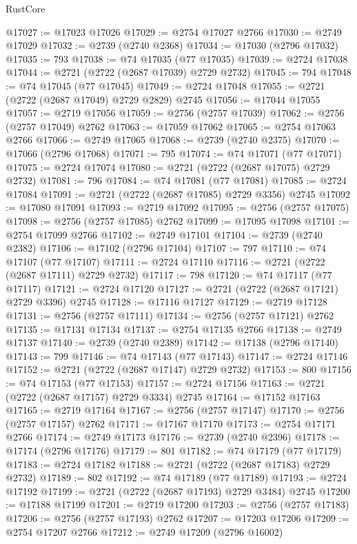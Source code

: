 \begin{lexlean}{RustCore}
\begin{coremodule}
@17027 := @17023 @17026
@17029 := @2754 @17027 @2766
@17030 := @2749 @17029
@17032 := @2739 (@2740 @2368)
@17034 := @17030 (@2796 @17032)
@17035 := 793
@17038 := @74 @17035 (@77 @17035)
@17039 := @2724 @17038
@17044 := @2721 (@2722 (@2687 @17039) @2729 @2732)
@17045 := 794
@17048 := @74 @17045 (@77 @17045)
@17049 := @2724 @17048
@17055 := @2721 (@2722 (@2687 @17049) @2729 @2829) @2745
@17056 := @17044 @17055
@17057 := @2719 @17056
@17059 := @2756 (@2757 @17039)
@17062 := @2756 (@2757 @17049) @2762
@17063 := @17059 @17062
@17065 := @2754 @17063 @2766
@17066 := @2749 @17065
@17068 := @2739 (@2740 @2375)
@17070 := @17066 (@2796 @17068)
@17071 := 795
@17074 := @74 @17071 (@77 @17071)
@17075 := @2724 @17074
@17080 := @2721 (@2722 (@2687 @17075) @2729 @2732)
@17081 := 796
@17084 := @74 @17081 (@77 @17081)
@17085 := @2724 @17084
@17091 := @2721 (@2722 (@2687 @17085) @2729 @3356) @2745
@17092 := @17080 @17091
@17093 := @2719 @17092
@17095 := @2756 (@2757 @17075)
@17098 := @2756 (@2757 @17085) @2762
@17099 := @17095 @17098
@17101 := @2754 @17099 @2766
@17102 := @2749 @17101
@17104 := @2739 (@2740 @2382)
@17106 := @17102 (@2796 @17104)
@17107 := 797
@17110 := @74 @17107 (@77 @17107)
@17111 := @2724 @17110
@17116 := @2721 (@2722 (@2687 @17111) @2729 @2732)
@17117 := 798
@17120 := @74 @17117 (@77 @17117)
@17121 := @2724 @17120
@17127 := @2721 (@2722 (@2687 @17121) @2729 @3396) @2745
@17128 := @17116 @17127
@17129 := @2719 @17128
@17131 := @2756 (@2757 @17111)
@17134 := @2756 (@2757 @17121) @2762
@17135 := @17131 @17134
@17137 := @2754 @17135 @2766
@17138 := @2749 @17137
@17140 := @2739 (@2740 @2389)
@17142 := @17138 (@2796 @17140)
@17143 := 799
@17146 := @74 @17143 (@77 @17143)
@17147 := @2724 @17146
@17152 := @2721 (@2722 (@2687 @17147) @2729 @2732)
@17153 := 800
@17156 := @74 @17153 (@77 @17153)
@17157 := @2724 @17156
@17163 := @2721 (@2722 (@2687 @17157) @2729 @3334) @2745
@17164 := @17152 @17163
@17165 := @2719 @17164
@17167 := @2756 (@2757 @17147)
@17170 := @2756 (@2757 @17157) @2762
@17171 := @17167 @17170
@17173 := @2754 @17171 @2766
@17174 := @2749 @17173
@17176 := @2739 (@2740 @2396)
@17178 := @17174 (@2796 @17176)
@17179 := 801
@17182 := @74 @17179 (@77 @17179)
@17183 := @2724 @17182
@17188 := @2721 (@2722 (@2687 @17183) @2729 @2732)
@17189 := 802
@17192 := @74 @17189 (@77 @17189)
@17193 := @2724 @17192
@17199 := @2721 (@2722 (@2687 @17193) @2729 @3484) @2745
@17200 := @17188 @17199
@17201 := @2719 @17200
@17203 := @2756 (@2757 @17183)
@17206 := @2756 (@2757 @17193) @2762
@17207 := @17203 @17206
@17209 := @2754 @17207 @2766
@17212 := @2749 @17209 (@2796 @16002)

\end{coremodule}
\end{lexlean}
